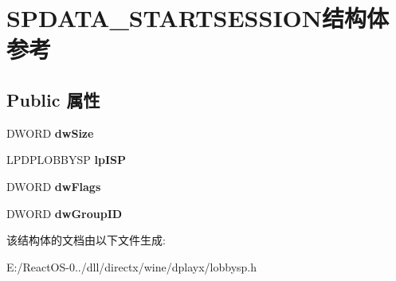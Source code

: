 \hypertarget{struct_s_p_d_a_t_a___s_t_a_r_t_s_e_s_s_i_o_n}{}\section{S\+P\+D\+A\+T\+A\+\_\+\+S\+T\+A\+R\+T\+S\+E\+S\+S\+I\+O\+N结构体 参考}
\label{struct_s_p_d_a_t_a___s_t_a_r_t_s_e_s_s_i_o_n}
\subsection*{Public 属性}
\begin{DoxyCompactItemize}
\item 
\mbox{\label{struct_s_p_d_a_t_a___s_t_a_r_t_s_e_s_s_i_o_n_a81f68efc36db696441604cec3875cb84}} 
D\+W\+O\+RD {\bfseries dw\+Size}
\item 
\mbox{\label{struct_s_p_d_a_t_a___s_t_a_r_t_s_e_s_s_i_o_n_a0f01e0706ebd12d59d168514f1d575c1}} 
L\+P\+D\+P\+L\+O\+B\+B\+Y\+SP {\bfseries lp\+I\+SP}
\item 
\mbox{\label{struct_s_p_d_a_t_a___s_t_a_r_t_s_e_s_s_i_o_n_a56c3646c4c7fe02b897acb62898d4970}} 
D\+W\+O\+RD {\bfseries dw\+Flags}
\item 
\mbox{\label{struct_s_p_d_a_t_a___s_t_a_r_t_s_e_s_s_i_o_n_a72ab31622bc633dd9692b64d1590818f}} 
D\+W\+O\+RD {\bfseries dw\+Group\+ID}
\end{DoxyCompactItemize}


该结构体的文档由以下文件生成\+:\begin{DoxyCompactItemize}
\item 
E\+:/\+React\+O\+S-\/0../dll/directx/wine/dplayx/lobbysp.\+h\end{DoxyCompactItemize}
